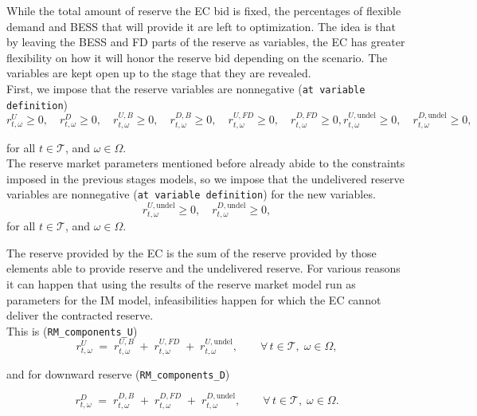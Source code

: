 \documentclass{article}
\begin{document}
\newline
While the total amount of reserve the EC bid is fixed, the percentages of flexible demand and BESS that will provide it are left to optimization. The idea is that by leaving the BESS and FD parts of the reserve as variables, the EC has greater flexibility on how it will honor the reserve bid depending on the scenario. The variables are kept open up to the stage that they are revealed.\\
First, we impose that the reserve variables are nonnegative (\verb|at variable definition|)
\begin{equation} \label{EQ:RVarDef}
    r^{U}_{t, \omega} \geq 0, \quad r^{D}_{t, \omega} \geq 0, \quad r^{U, B}_{t, \omega} \geq 0, \quad r^{D, B}_{t, \omega} \geq 0, \quad r^{U, FD}_{t, \omega} \geq 0, \quad r^{D, FD}_{t, \omega} \geq 0, r^{U,\text{undel}}_{t,\omega} \geq 0, \quad r^{D,\text{undel}}_{t,\omega} \geq 0, 
\end{equation}

for all $t \in \mathcal{T}$, and $\omega \in \Omega$. \\
The reserve market parameters mentioned before already  abide to the constraints imposed in the previous stages models, so we impose that the undelivered reserve variables are nonnegative (\verb|at variable definition|) for the new variables.
\begin{equation} \label{EQ:RVarDef}
    r^{U,\text{undel}}_{t,\omega} \geq 0, \quad r^{D,\text{undel}}_{t,\omega} \geq 0, 
\end{equation}
for all $t \in \mathcal{T}$, and $\omega \in \Omega$. 

The reserve provided by the EC is the sum of the reserve provided by those elements able to provide reserve and the undelivered reserve. For various reasons it can happen that using the results of the reserve market model run as parameters for the IM model, infeasibilities happen for which the EC cannot deliver the contracted reserve.  \\
This is (\verb|RM_components_U|)\\
\begin{equation} \label{EQ:RUcom}
    r^{U}_{t,\omega} \;=\;
        r^{U,B}_{t,\omega}
      \;+\; r^{U,FD}_{t,\omega}
      \;+\; r^{U,\text{undel}}_{t,\omega},
    \qquad \forall\, t\in\mathcal T,\;\omega\in\Omega ,
\end{equation}

and for downward reserve (\verb|RM_components_D|)

\begin{equation} \label{EQ:RDcomp}
    r^{D}_{t,\omega} \;=\;
        r^{D,B}_{t,\omega}
      \;+\; r^{D,FD}_{t,\omega}
      \;+\; r^{D,\text{undel}}_{t,\omega},
    \qquad \forall\, t\in\mathcal T,\;\omega\in\Omega .
\end{equation}
\end{document}
